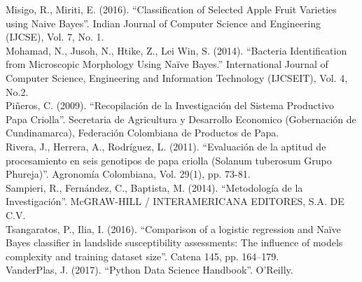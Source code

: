 \noindent
Misigo, R., Miriti, E. (2016). "`Classification of Selected Apple Fruit Varieties using Naive Bayes"'. Indian Journal of Computer Science and Engineering (IJCSE), Vol. 7, No. 1.\\

\noindent
Mohamad, N., Jusoh, N., Htike, Z., Lei Win, S. (2014). "`Bacteria Identification from Microscopic Morphology Using Naïve Bayes."' International Journal of Computer Science, Engineering and Information Technology (IJCSEIT), Vol. 4, No.2.\\

\noindent 
Piñeros, C. (2009). "`Recopilación de la Investigación del Sistema Productivo Papa Criolla"'. Secretaria de Agricultura y Desarrollo Economico (Gobernación de Cundinamarca), Federación Colombiana de Productos de Papa.\\

\noindent
Rivera, J., Herrera, A., Rodríguez, L. (2011). "`Evaluación de la aptitud de procesamiento en seis genotipos de papa criolla (Solanum tuberosum Grupo Phureja)"'. Agronomía Colombiana, Vol. 29(1), pp. 73-81.\\

\noindent
Sampieri, R., Fernández, C., Baptista, M. (2014). "`Metodología de la Investigación"'. McGRAW-HILL / INTERAMERICANA EDITORES, S.A. DE C.V.\\

\noindent
Tsangaratos, P., Ilia, I. (2016). "`Comparison of a logistic regression and Naïve Bayes classifier in landslide susceptibility assessments: The influence of models complexity and training dataset size"'. Catena 145, pp. 164–179.\\

\noindent
VanderPlas, J. (2017). "`Python Data Science Handbook"'. O’Reilly.\\


\noindent

\noindent

\noindent

